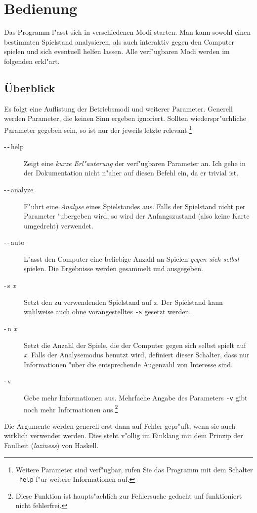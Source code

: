 \documentclass{scrreprt}
\begin{document}
\chapter{Bedienung}
Das Programm l"asst sich in verschiedenen Modi starten.  Man kann sowohl einen
bestimmten Spielstand analysieren, als auch interaktiv gegen den Computer
spielen und sich eventuell helfen lassen.  Alle verf"ugbaren Modi werden im
folgenden erkl"art.

\section{Überblick}
Es folgt eine Auflistung der Betriebsmodi und weiterer Parameter.  Generell
werden Parameter, die keinen Sinn ergeben ignoriert.  Sollten wiederspr"uchliche
Parameter gegeben sein, so ist nur der jeweils letzte relevant.\footnote{Weitere
Parameter sind verf"ugbar, rufen Sie das Programm mit dem Schalter \texttt
{-\-help} f"ur weitere Informationen auf.}

\begin{description}
\item[-\,-\,help] Zeigt eine \emph{kurze Erl"auterung} der verf"ugbaren
  Parameter an.  Ich gehe in der Dokumentation nicht n"aher auf diesen Befehl
  ein, da er trivial ist.
\item[-\,-\,analyze] F"uhrt eine \emph{Analyse} eines Spielstandes aus.  Falls
  der Spielstand nicht per Parameter "ubergeben wird, so wird der Anfangszustand
  (also keine Karte umgedreht) verwendet.
\item[-\,-\,auto] L"asst den Computer eine beliebige Anzahl an Spielen \emph
  {gegen sich selbst} spielen.  Die Ergebnisse werden gesammelt und ausgegeben.
\item[-\,s \textit{x}] Setzt den zu verwendenden Spielstand auf \textit{x}.  Der
  Spielstand kann wahlweise auch ohne vorangestelltes \texttt{-s} gesetzt
  werden.
\item[-\,n \textit{x}] Setzt die Anzahl der Spiele, die der Computer gegen sich
  selbst spielt auf \textit{x}.  Falls der Analysemodus benutzt wird, definiert
  dieser Schalter, dass nur Informationen "uber die entsprechende Augenzahl von
  Interesse sind.
\item[-\,v] Gebe mehr Informationen aus.  Mehrfache Angabe des Parameters
  \texttt{-v} gibt noch mehr Informationen aus.\footnote{Diese Funktion ist
  haupts"achlich zur Fehlersuche gedacht unf funktioniert nicht fehlerfrei.}
\end{description}
Die Argumente werden generell erst dann auf Fehler gepr"uft, wenn sie auch
wirklich verwendet werden.  Dies steht v"ollig im Einklang mit dem Prinzip der
Faulheit (\emph{laziness}) von Haskell.
\end{document}
